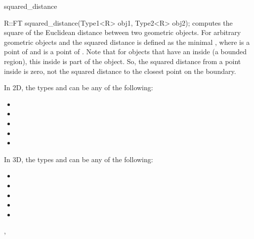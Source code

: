 \begin{ccRefFunction}{squared_distance}
\\

{R::FT squared_distance(Type1<R> obj1, Type2<R> obj2);}
{computes the square of the Euclidean distance between two geometric objects. 
For arbitrary geometric objects  and
 the squared distance is defined as the minimal
, where  is a point of
 and  is a point of .
Note that for objects that have an inside (a bounded region), this inside 
is part of the object. So, the squared distance from a point inside is 
zero, not the squared distance to the closest point on the boundary.}

In 2D, the types  and  can be any of the
following:
\begin{itemize}
\item {}
\item {}
\item {}
\item {}
\item {}
\end{itemize}

In 3D, the types  and  can be any of the
following:
\begin{itemize}
\item {}
\item {}
\item {}
\item {}
\item {}
\end{itemize}

\ccSeeAlso
{}, \\

\end{ccRefFunction}
